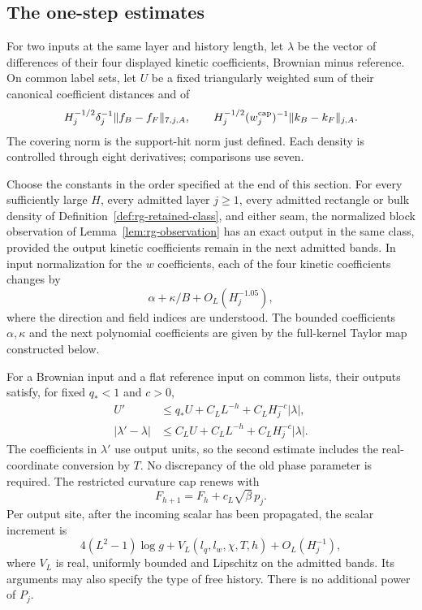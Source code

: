\subsection{The one-step estimates}
\label{subsec:rg-step-estimates}

For two inputs at the same layer and history length, let $\lambda$ be
the vector of differences of their four displayed kinetic coefficients,
Brownian minus reference.  On common label sets, let $U$ be a fixed
triangularly weighted sum of their canonical coefficient distances and
of
\[
 H_j^{-1/2}\delta_j^{-1}\|f_B-f_F\|_{7,j,A},\qquad
 H_j^{-1/2}(w_j^{\rm cap})^{-1}\|k_B-k_F\|_{j,A}.
\]
The covering norm is the support-hit norm just defined.  Each density is
controlled through eight derivatives; comparisons use seven.

\begin{theorem}\label{thm:rg-step}
Choose the constants in the order specified at the end of this section.
For every sufficiently large $H$, every admitted layer $j\ge1$, every
admitted rectangle or bulk density of Definition~\ref{def:rg-retained-class},
and either seam, the normalized block observation of
Lemma~\ref{lem:rg-observation} has an exact output in the same class,
provided the output kinetic coefficients remain in the next admitted
bands.  In input normalization
for the $w$ coefficients, each of the four kinetic coefficients changes by
\begin{equation}
              \alpha+\kappa/B+O_L(H_j^{-1.05}),
 \label{eq:R6}
\end{equation}
where the direction and field indices are understood.  The bounded
coefficients $\alpha,\kappa$ and the next polynomial coefficients are
given by the full-kernel Taylor map constructed below.

For a Brownian input and a flat reference input on common lists, their
outputs satisfy, for fixed $q_*<1$ and $c>0$,
\begin{equation}
 \begin{split}
 U'&\le q_*U+C_LL^{-h}+C_LH_j^{-c}|\lambda|,\\
 |\lambda'-\lambda|&\le C_LU+C_LL^{-h}
                                      +C_LH_j^{-c}|\lambda|.
 \end{split}
 \label{eq:R7}
\end{equation}
The coefficients in $\lambda'$ use output units, so the second estimate
includes the real-coordinate conversion by $T$.  No discrepancy of the
old phase parameter is required.  The restricted curvature cap renews
with
\begin{equation}
                 F_{h+1}=F_h+c_L\sqrt\beta\,p_j.
 \label{eq:R10}
\end{equation}
Per output site, after the incoming scalar has been propagated, the
scalar increment is
\begin{equation}
 4(L^2-1)\log g+V_L(l_q,l_w,\chi,T,h)+O_L(H_j^{-1}),
 \label{eq:R11}
\end{equation}
where $V_L$ is real, uniformly bounded and Lipschitz on the admitted
bands.  Its arguments may also specify the type of free history.
There is no additional power of $P_j$.
\end{theorem}


